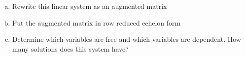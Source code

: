 \documentclass[11pt]{exam}
\theoremstyle{definition}
\begin{document}
\begin{questions}
\begin{enumerate}[(a)]
\item Rewrite this linear system as an augmented matrix
\vspace{1.5in}
\item Put the augmented matrix in row reduced echelon form
\vspace{4in}
\item Determine which variables are free and which variables are dependent.  How many solutions does this system have?
\end{enumerate}

\end{questions}
\end{document}
